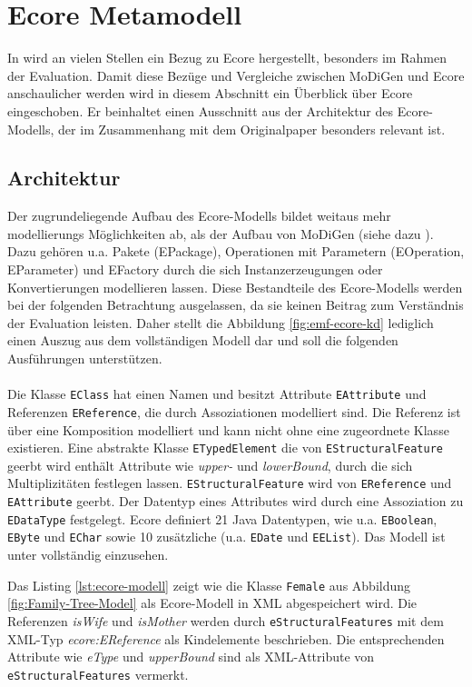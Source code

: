 \section{Ecore Metamodell}
In \cite{gerhart2015approach} wird an vielen Stellen ein Bezug zu Ecore hergestellt, besonders im Rahmen der Evaluation. Damit diese Bezüge und Vergleiche zwischen MoDiGen und Ecore anschaulicher werden wird in diesem Abschnitt ein Überblick über Ecore eingeschoben. Er beinhaltet einen Ausschnitt aus der Architektur des Ecore-Modells, der im Zusammenhang mit dem Originalpaper besonders relevant ist.

\subsection{Architektur}
Der zugrundeliegende Aufbau des Ecore-Modells bildet weitaus mehr modellierungs Möglichkeiten ab, als der Aufbau von MoDiGen (siehe dazu \cite{eclipse_ecore}). Dazu gehören u.a. Pakete (EPackage), Operationen mit Parametern (EOperation, EParameter) und EFactory durch die sich Instanzerzeugungen oder Konvertierungen modellieren lassen. Diese Bestandteile des Ecore-Modells werden bei der folgenden Betrachtung ausgelassen, da sie keinen Beitrag zum Verständnis der Evaluation  leisten. Daher stellt die Abbildung \ref{fig:emf-ecore-kd} lediglich einen Auszug aus dem vollständigen Modell dar und soll die folgenden Ausführungen unterstützen.\\
\\
Die Klasse \texttt{EClass} hat einen Namen und besitzt Attribute \texttt{EAttribute} und Referenzen \texttt{EReference}, die durch Assoziationen modelliert sind. Die Referenz ist über eine Komposition modelliert und kann nicht ohne eine zugeordnete Klasse existieren. Eine abstrakte Klasse \texttt{ETypedElement} die von \texttt{EStructuralFeature} geerbt wird enth\"alt Attribute wie \textit{upper-} und \textit{lowerBound}, durch die sich Multiplizitäten festlegen lassen. \texttt{EStructuralFeature} wird von \texttt{EReference} und \texttt{EAttribute} geerbt. Der Datentyp eines Attributes wird durch eine Assoziation zu \texttt{EDataType} festgelegt. Ecore definiert 21 Java Datentypen, wie u.a. \texttt{EBoolean}, \texttt{EByte} und \texttt{EChar} sowie 10 zus\"atzliche (u.a. \texttt{EDate} und \texttt{EEList}). Das Modell ist unter \cite{eclipse_ecore} vollst\"andig einzusehen.



Das Listing \ref{lst:ecore-modell} zeigt wie die Klasse \texttt{Female} aus Abbildung \ref{fig:Family-Tree-Model} als Ecore-Modell in XML abgespeichert wird. Die Referenzen \textit{isWife} und \textit{isMother} werden durch \texttt{eStructuralFeatures} mit dem XML-Typ \textit{ecore:EReference} als Kindelemente beschrieben. Die entsprechenden Attribute wie \textit{eType} und \textit{upperBound} sind als XML-Attribute von \texttt{eStructuralFeatures} vermerkt.


